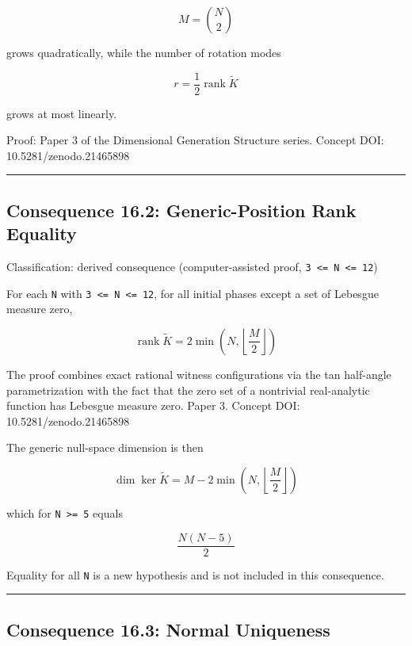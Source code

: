 \documentclass[
  a4paper,
]{article}
\begin{document}
\[
M=\binom{N}{2}
\]

grows quadratically, while the number of rotation modes

\[
r=\frac12\operatorname{rank}\widetilde K
\]

grows at most linearly.

Proof: Paper 3 of the Dimensional Generation Structure series. Concept
DOI: 10.5281/zenodo.21465898

\begin{center}\rule{0.5\linewidth}{0.5pt}\end{center}

\subsection{Consequence 16.2: Generic-Position Rank
Equality}\label{consequence-16.2-generic-position-rank-equality}

Classification: derived consequence (computer-assisted proof,
\texttt{3\ \textless{}=\ N\ \textless{}=\ 12})

For each \texttt{N} with \texttt{3\ \textless{}=\ N\ \textless{}=\ 12},
for all initial phases except a set of Lebesgue measure zero,

\[
\operatorname{rank}\widetilde K
=
2\min\!\left(N,\left\lfloor\frac{M}{2}\right\rfloor\right)
\]

The proof combines exact rational witness configurations via the tan
half-angle parametrization with the fact that the zero set of a
nontrivial real-analytic function has Lebesgue measure zero. Paper 3.
Concept DOI: 10.5281/zenodo.21465898

The generic null-space dimension is then

\[
\dim\ker\widetilde K
=
M-2\min\!\left(N,\left\lfloor\frac{M}{2}\right\rfloor\right)
\]

which for \texttt{N\ \textgreater{}=\ 5} equals

\[
\frac{N(N-5)}{2}
\]

Equality for all \texttt{N} is a new hypothesis and is not included in
this consequence.

\begin{center}\rule{0.5\linewidth}{0.5pt}\end{center}

\subsection{Consequence 16.3: Normal
Uniqueness}\label{consequence-16.3-normal-uniqueness}
\end{document}
